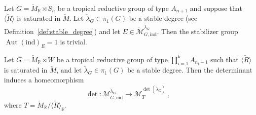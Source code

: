 \documentclass[10pt,a4paper]{amsart}
\DeclareMathOperator{\Aut}{Aut}
\newcommand{\Mcheck}{{\check{M}}}
\newcommand{\R}{\mathbb{R}}
\newcommand{\RR}{\mathbb{R}}
\newcommand{\Rcheck}{\check{R}}
\newcommand{\ind}{\mathrm{ind}}
\newcommand{\lambdacheck}{\check{\lambda}}
\newcommand{\mc}[1]{{\mathcal{#1}}}
\newcommand{\wmc}[1]{{\widetilde{\mathcal{#1}}}}
\begin{document}
\begin{lemma}
\label{lem:stabilizers in Aut(tau) in An case}
Let $G=\Mcheck_\R\rtimes S_n$ be a tropical reductive group of type $A_{n+1}$ and suppose that $\langle \Rcheck\rangle$ is saturated in $\Mcheck$. Let $\lambdacheck_G\in \pi_1(G)$ be a stable degree (see Definition~\ref{def:stable_degree}) and let $E\in \wmc M_{G,\ind}^{\lambdacheck_G}$. Then the stabilizer group $\Aut(\ind)_E=1$ is trivial.
\end{lemma}

\begin{lemma}
\label{lem:determinant is isomorphism if roots are saturated}
Let $G=\Mcheck_\R \rtimes W$ be a tropical reductive group of type $\prod_{i=1}^k A_{n_i-1}$ such that $\langle\Rcheck\rangle$ is saturated in $\Mcheck$, and let $\lambdacheck_G\in \pi_1(G)$ be a stable degree. Then the determinant induces a homeomorphism
\[
    \det\colon \mc M^{\lambdacheck_G}_{G,\ind}\longrightarrow \mc M^{\det(\lambdacheck_G)}_{T} \ ,
\]
where $T=\Mcheck_{\RR}/\langle \Rcheck\rangle_{\RR}$.
\end{lemma}
\end{document}
